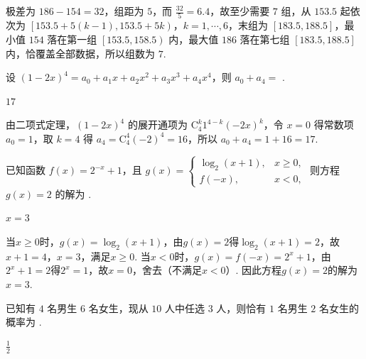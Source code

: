 \begin{solution}
极差为 \(186-154=32\)，组距为 \(5\)，而 \(\frac{32}{5}=6.4\)，故至少需要 \(7\) 组，从 \(153.5\) 起依次为 \(\left[153.5+5(k-1),153.5+5k\right)\)，\(k=1,\cdots,6\)，末组为 \(\left[183.5,188.5\right]\)，最小值 \(154\) 落在第一组 \(\left[153.5,158.5\right)\) 内，最大值 \(186\) 落在第七组 \(\left[183.5,188.5\right]\) 内，恰覆盖全部数据，所以组数为 \(7\).
\end{solution}

\begin{problem}
设 \(\left(1-2x\right)^4=a_0+a_1x+a_2x^2+a_3x^3+a_4x^4\)，则 \(a_0+a_4=\)\fillinblank{} .
\end{problem}

\begin{answer}
\(17\)
\end{answer}

\begin{solution}
由二项式定理，\(\left(1-2x\right)^4\) 的展开通项为 \(\mathrm C_4^k1^{4-k}\left(-2x\right)^k\)，令 \(x=0\) 得常数项 \(a_0=1\)，取 \(k=4\) 得 \(a_4=\mathrm C_4^4\left(-2\right)^4=16\)，所以 \(a_0+a_4=1+16=17\).
\end{solution}

\begin{problem}
已知函数 \(f(x)=2^{-x}+1\)，且 \(g(x)= \begin{cases}
\log_2(x+1),  &x\ge 0,\\
f(-x),  &x<0,
\end{cases}\)
则方程 \(g(x)=2\) 的解为\fillinblank{} .
\end{problem}

\begin{answer}
\(x=3\)
\end{answer}

\begin{solution}
当\(x\ge 0\)时，\(g(x)=\log_2\left(x+1\right)\)，由\(g(x)=2\)得\(\log_2\left(x+1\right)=2\)，故\(x+1=4\)，\(x=3\)，满足\(x\ge 0\). 当\(x<0\)时，\(g(x)=f(-x)=2^{x}+1\)，由\(2^{x}+1=2\)得\(2^{x}=1\)，故\(x=0\)，舍去（不满足\(x<0\)）. 因此方程\(g(x)=2\)的解为\(x=3\).
\end{solution}

\begin{problem}
已知有 \(4\) 名男生 \(6\) 名女生，现从 \(10\) 人中任选 \(3\) 人，则恰有 \(1\) 名男生 \(2\) 名女生的概率为\fillinblank{} .
\end{problem}

\begin{answer}
\(\frac{1}{2}\)
\end{answer}

